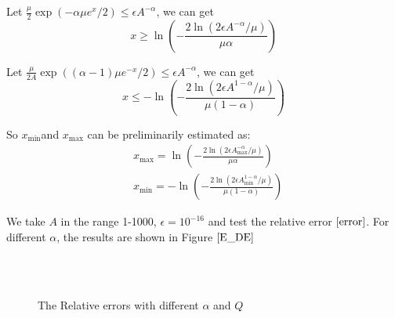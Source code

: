 Let $\frac{\mu}{2}\exp \left(  -\alpha \mu e^x /2\right) \leq \epsilon A^{-\alpha}$, we can get
\begin{equation}
x\geq \ln\left(-\frac{2\ln(2\epsilon A^{-\alpha}/\mu)}{\mu \alpha}\right)
\end{equation}

Let $\frac{\mu}{2 A}  \exp \left((\alpha-1)\mu e^{-x}/2\right) \leq \epsilon A^{-\alpha}$, we can get
\begin{equation}
x\leq -\ln\left(-\frac{2\ln(2\epsilon A^{1-\alpha}/\mu)}{\mu(1-\alpha)}\right)
\end{equation}

So  $x_{\min}$and $x_{\max}$ can be preliminarily estimated as:
\begin{equation}
\begin{aligned}
&x_{\max}=\ln\left(-\frac{2\ln(2\epsilon A_{\max}^{-\alpha}/\mu)}{\mu \alpha}\right)\\
&x_{\min}=-\ln\left(-\frac{2\ln(2\epsilon A_{\min}^{1-\alpha}/\mu)}{\mu(1-\alpha)}\right)
\end{aligned}
\end{equation}

We take $A$ in the range 1-1000,  $\epsilon=10^{-16}$ and test the relative error $\eqref{error}$. For different $\alpha $, the results are shown in Figure $\ref{E_DE}$

 \begin{figure}[htbp]
\centering
{}
~~
~~
\\
~~
~~
  \caption{The Relative errors with different $\alpha$ and $Q$}
  \label{E_DE}
\end{figure}

